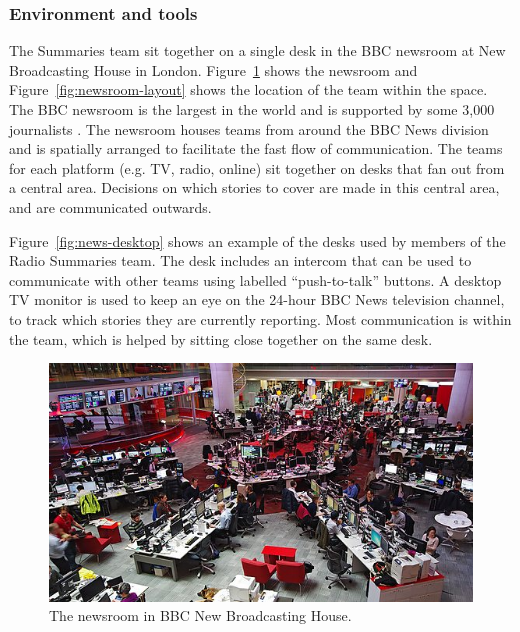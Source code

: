 \subsubsection{Environment and tools}
The Summaries team sit together on a single desk in the BBC newsroom at New Broadcasting House in London.
Figure~\ref{fig:newsroom} shows the newsroom and Figure~\ref{fig:newsroom-layout} shows the location of the team within
the space. The BBC newsroom is the largest in the world and is supported by some 3,000 journalists
\citep[p.~80]{McLeish2015}.  The newsroom houses teams from around the BBC News division and is spatially arranged to
facilitate the fast flow of communication. The teams for each platform (e.g. TV, radio, online) sit together on desks
that fan out from a central area. Decisions on which stories to cover are made in this central area, and are
communicated outwards.

Figure~\ref{fig:news-desktop} shows an example of the desks used by members of the Radio Summaries team. The desk
includes an intercom that can be used to communicate with other teams using labelled ``push-to-talk'' buttons. A
desktop TV monitor is used to keep an eye on the 24-hour BBC News television channel, to track which stories they are
currently reporting. Most communication is within the team, which is helped by sitting close together on the same desk.

\begin{figure}
  \centering
  \includegraphics[width=\columnwidth]{figs/newsroom.jpg}
  \caption{The newsroom in BBC New Broadcasting House.}
  \label{fig:newsroom}
\end{figure}

